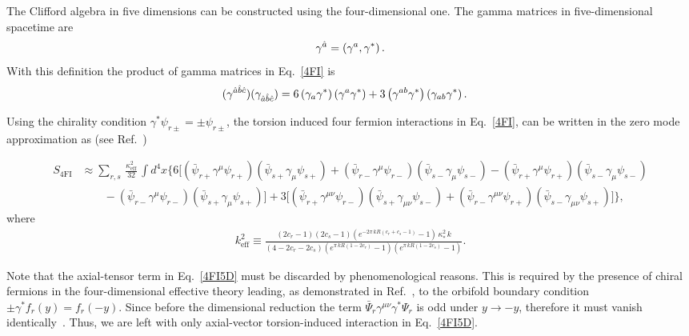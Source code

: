 \documentclass[twocolumn,showpacs,showkeys,prd,superscriptaddress]{revtex4-1}
\begin{document}
The Clifford algebra in five dimensions can be constructed using the four-dimensional one. The gamma matrices in five-dimensional spacetime are
\begin{align}
  \gamma^{\hat{a}} = \left(\gamma^a,\gamma^*\right).
\end{align}
With this definition the product of gamma matrices in Eq.~\eqref{4FI} is 
\begin{align}
  (\gamma^{\hat{a}\hat{b}\hat{c}})(\gamma_{\hat{a}\hat{b}\hat{c}}) &= 6\left(\gamma_a\gamma^*\right)\left(\gamma^a\gamma^*\right) + 3\left(\gamma^{ab}\gamma^*\right)\left(\gamma_{ab}\gamma^*\right).
\end{align}


Using the chirality condition $\gamma^*\psi_{r\pm} = \pm\psi_{r\pm}$, the torsion induced four fermion interactions in Eq.~\eqref{4FI}, can be written in the zero mode approximation as (see Ref.~\cite{Castillo-Felisola:2013jva})
\begin{widetext}
  \begin{align}
    \nonumber
    S_{4\text{FI}} &\approx \sum_{r,s}\,\frac{\kappa_{\text{eff}}^2}{32}\,\int d^4x\bigg\{6\bigg[\left(\bar{\psi}_{r+}\gamma^\mu\psi_{r+}\right)\left(\bar{\psi}_{s+}\gamma_\mu\psi_{s+}\right) + \left(\bar{\psi}_{r-}\gamma^\mu\psi_{r-}\right)\left(\bar{\psi}_{s-}\gamma_\mu\psi_{s-}\right) - \left(\bar{\psi}_{r+}\gamma^\mu\psi_{r+}\right)\left(\bar{\psi}_{s-}\gamma_\mu\psi_{s-}\right) \\ 
      \label{4FI5D}
      &\qquad - \left(\bar{\psi}_{r-}\gamma^\mu\psi_{r-}\right)\left(\bar{\psi}_{s+}\gamma_\mu\psi_{s+}\right)\bigg] +  3\bigg[\left(\bar{\psi}_{r+}\gamma^{\mu\nu}\psi_{r-}\right)\left(\bar{\psi}_{s+}\gamma_{\mu\nu}\psi_{s-}\right) + \left(\bar{\psi}_{r-}\gamma^{\mu\nu}\psi_{r+}\right)\left(\bar{\psi}_{s-}\gamma_{\mu\nu}\psi_{s+}\right)\bigg]\bigg\},
  \end{align}
where 
\begin{align}
  \label{kapparel}
  k_{\text{eff}}^2 \equiv \frac{(2c_r -1)(2c_s - 1)\left(e^{-2\pi\,kR\left(c_r + c_s -1\right)} - 1\right)\,\kappa_*^2\,k}{(4 - 2c_r - 2c_s)\left(e^{\pi\,kR\left(1 - 2c_r\right)}-1\right)\left(e^{\pi\,kR\left(1 - 2c_s\right)}-1\right)}.
\end{align}
\end{widetext}

Note that the axial-tensor term in Eq.~\eqref{4FI5D} must be discarded by phenomenological reasons.  This is required by the presence of chiral fermions in the four-dimensional effective theory leading, as demonstrated in Ref.~\cite{Flachi:2001bj}, to the orbifold boundary condition $\pm\gamma^*f_r(y)=f_r(-y)$.  Since before the dimensional reduction the term $\bar{\Psi}_r\gamma^{\mu\nu}\gamma^*\Psi_r$ is odd under $y\rightarrow-y$, therefore it must vanish identically~\cite{Lebedev:2002dp}. Thus, we are left with only axial-vector torsion-induced interaction in Eq.~\eqref{4FI5D}.
\end{document}
